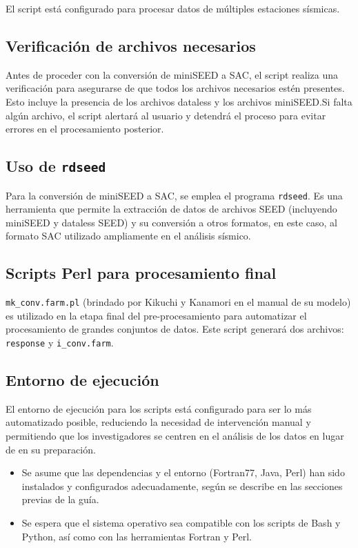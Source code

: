 \documentclass[a4paper,11pt]{refart}
\begin{document}
El script está configurado para procesar datos de múltiples estaciones sísmicas.

\subsection{Verificación de archivos necesarios}

Antes de proceder con la conversión de miniSEED a SAC, el script realiza una verificación para asegurarse de que todos los archivos necesarios estén presentes. Esto incluye la presencia de los archivos dataless y los archivos miniSEED.\@ Si falta algún archivo, el script alertará al usuario y detendrá el proceso para evitar errores en el procesamiento posterior.

\subsection{Uso de \texttt{rdseed}}

Para la conversión de miniSEED a SAC, se emplea el programa \texttt{rdseed}. Es una herramienta que permite la extracción de datos de archivos SEED (incluyendo miniSEED y dataless SEED) y su conversión a otros formatos, en este caso, al formato SAC utilizado ampliamente en el análisis sísmico.

\subsection{Scripts Perl para procesamiento final}

\texttt{mk\_conv.farm.pl} (brindado por Kikuchi y Kanamori en el manual de su modelo) es utilizado en la etapa final del pre-procesamiento para automatizar el procesamiento de grandes conjuntos de datos. Este script generará dos archivos: \texttt{response} y \texttt{i\_conv.farm}.

\subsection{Entorno de ejecución}

El entorno de ejecución para los scripts está configurado para ser lo más automatizado posible, reduciendo la necesidad de intervención manual y permitiendo que los investigadores se centren en el análisis de los datos en lugar de en su preparación.

\begin{itemize}
\item Se asume que las dependencias y el entorno (Fortran77, Java, Perl) han sido instalados y configurados adecuadamente, según se describe en las secciones previas de la guía.
\item Se espera que el sistema operativo sea compatible con los scripts de Bash y Python, así como con las herramientas Fortran y Perl.
\end{itemize}
\end{document}

